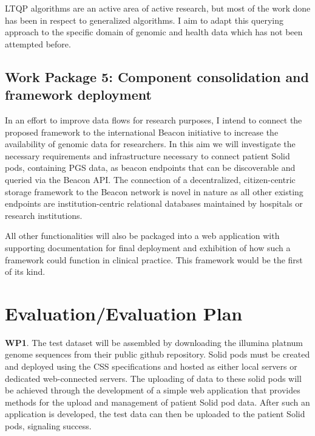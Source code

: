 \documentclass[runningheads]{llncs}
\begin{document}
LTQP algorithms are an active area of active research, but most of the work done has been in respect to generalized algorithms.
I aim to adapt this querying approach to the specific domain of genomic and health data which has not been attempted before. 

\subsection{Work Package 5: Component consolidation and framework deployment}

In an effort to improve data flows for research purposes, I intend to connect the proposed framework to the international Beacon initiative \cite{rambla_beacon_2022} to increase the availability of genomic data for researchers. 
In this aim we will investigate the necessary requirements and infrastructure necessary to connect patient Solid pods, containing PGS data, as beacon endpoints that can be discoverable and queried via the Beacon API. 
The connection of a decentralized, citizen-centric storage framework to the Beacon network is novel in nature as all other existing endpoints are institution-centric relational databases maintained by hospitals or research institutions.

All other functionalities will also be packaged into a web application with supporting documentation for final deployment and exhibition of how such a framework could function in clinical practice.
This framework would be the first of its kind.

\section{Evaluation/Evaluation Plan}

\textbf{WP1}.
The test dataset will be assembled by downloading the illumina platnum genome sequences from their public github repository.
Solid pods must be created and deployed using the CSS specifications and hosted as either local servers or dedicated web-connected servers.
The uploading of data to these solid pods will be achieved through the development of a simple web application that provides methods for the upload and management of patient Solid pod data. 
After such an application is developed, the test data can then be uploaded to the patient Solid pods, signaling success.
\end{document}
